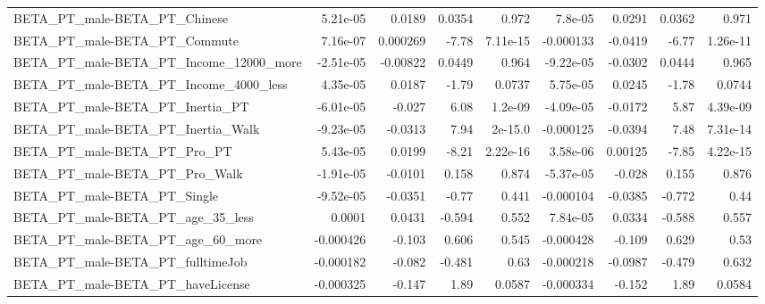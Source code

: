 \begin{tabular}{lrrrrrrrr}
BETA\_PT\_male-BETA\_PT\_Chinese                       &    5.21e-05 &       0.0189 &   0.0354 &    0.972 &    7.8e-05 &      0.0291 &       0.0362 &         0.971 \\
BETA\_PT\_male-BETA\_PT\_Commute                       &    7.16e-07 &     0.000269 &    -7.78 & 7.11e-15 &  -0.000133 &     -0.0419 &        -6.77 &      1.26e-11 \\
BETA\_PT\_male-BETA\_PT\_Income\_12000\_more             &   -2.51e-05 &     -0.00822 &   0.0449 &    0.964 &  -9.22e-05 &     -0.0302 &       0.0444 &         0.965 \\
BETA\_PT\_male-BETA\_PT\_Income\_4000\_less              &    4.35e-05 &       0.0187 &    -1.79 &   0.0737 &   5.75e-05 &      0.0245 &        -1.78 &        0.0744 \\
BETA\_PT\_male-BETA\_PT\_Inertia\_PT                    &   -6.01e-05 &       -0.027 &     6.08 &  1.2e-09 &  -4.09e-05 &     -0.0172 &         5.87 &      4.39e-09 \\
BETA\_PT\_male-BETA\_PT\_Inertia\_Walk                  &   -9.23e-05 &      -0.0313 &     7.94 &  2e-15.0 &  -0.000125 &     -0.0394 &         7.48 &      7.31e-14 \\
BETA\_PT\_male-BETA\_PT\_Pro\_PT                        &    5.43e-05 &       0.0199 &    -8.21 & 2.22e-16 &   3.58e-06 &     0.00125 &        -7.85 &      4.22e-15 \\
BETA\_PT\_male-BETA\_PT\_Pro\_Walk                      &   -1.91e-05 &      -0.0101 &    0.158 &    0.874 &  -5.37e-05 &      -0.028 &        0.155 &         0.876 \\
BETA\_PT\_male-BETA\_PT\_Single                        &   -9.52e-05 &      -0.0351 &    -0.77 &    0.441 &  -0.000104 &     -0.0385 &       -0.772 &          0.44 \\
BETA\_PT\_male-BETA\_PT\_age\_35\_less                   &      0.0001 &       0.0431 &   -0.594 &    0.552 &   7.84e-05 &      0.0334 &       -0.588 &         0.557 \\
BETA\_PT\_male-BETA\_PT\_age\_60\_more                   &   -0.000426 &       -0.103 &    0.606 &    0.545 &  -0.000428 &      -0.109 &        0.629 &          0.53 \\
BETA\_PT\_male-BETA\_PT\_fulltimeJob                   &   -0.000182 &       -0.082 &   -0.481 &     0.63 &  -0.000218 &     -0.0987 &       -0.479 &         0.632 \\
BETA\_PT\_male-BETA\_PT\_haveLicense                   &   -0.000325 &       -0.147 &     1.89 &   0.0587 &  -0.000334 &      -0.152 &         1.89 &        0.0584 \\

\end{tabular}

